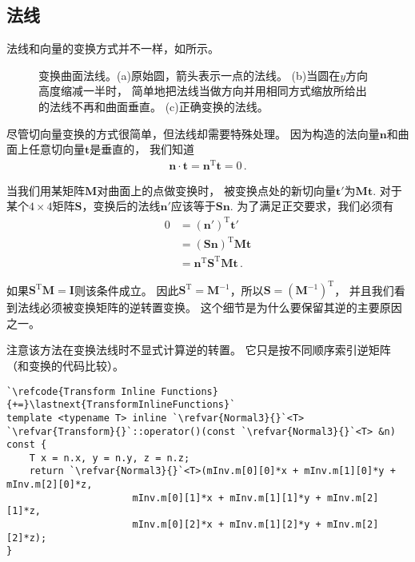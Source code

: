 \subsection{法线}\label{sub:法线}
法线和向量的变换方式并不一样，如所示。
\begin{figure}[htbp]
    \centering
    \caption{变换曲面法线。(a)原始圆，箭头表示一点的法线。
        (b)当圆在$y$方向高度缩减一半时，
        简单地把法线当做方向并用相同方式缩放所给出的法线不再和曲面垂直。
        (c)正确变换的法线。}
    \label{fig:2.14}
\end{figure}

尽管切向量变换的方式很简单，但法线却需要特殊处理。
因为构造的法向量$\bm n$和曲面上任意切向量$\bm t$是垂直的，
我们知道
\begin{align*}
    \bm n\cdot\bm t=\bm n^\mathrm{T}\bm t=0\, .
\end{align*}

当我们用某矩阵$\bm M$对曲面上的点做变换时，
被变换点处的新切向量$\bm t'$为$\bm M\bm t$.
对于某个$4\times4$矩阵$\bm S$，变换后的法线$\bm n'$应该等于$\bm S\bm n$.
为了满足正交要求，我们必须有
\begin{align*}
    0 & =(\bm n')^\mathrm{T}\bm t'                      \\
      & =(\bm S\bm n)^\mathrm{T}\bm M\bm t              \\
      & =\bm n^\mathrm{T}\bm S^\mathrm{T}\bm M\bm t\, .
\end{align*}

如果$\bm S^\mathrm{T}\bm M=\bm I$则该条件成立。
因此$\bm S^\mathrm{T}=\bm M^{-1}$，所以$\bm S=(\bm M^{-1})^\mathrm{T}$，
并且我们看到法线必须被变换矩阵的逆转置变换。
这个细节是为什么要保留其逆的主要原因之一。

注意该方法在变换法线时不显式计算逆的转置。
它只是按不同顺序索引逆矩阵（和变换的代码比较）。
\begin{lstlisting}
`\refcode{Transform Inline Functions}{+=}\lastnext{TransformInlineFunctions}`
template <typename T> inline `\refvar{Normal3}{}`<T>
`\refvar{Transform}{}`::operator()(const `\refvar{Normal3}{}`<T> &n) const {
    T x = n.x, y = n.y, z = n.z;
    return `\refvar{Normal3}{}`<T>(mInv.m[0][0]*x + mInv.m[1][0]*y + mInv.m[2][0]*z,
                      mInv.m[0][1]*x + mInv.m[1][1]*y + mInv.m[2][1]*z,
                      mInv.m[0][2]*x + mInv.m[1][2]*y + mInv.m[2][2]*z);
}
\end{lstlisting}

